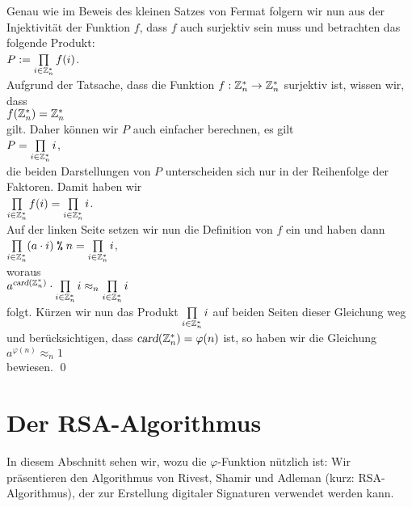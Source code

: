 Genau wie im Beweis des kleinen Satzes von Fermat folgern wir nun aus der Injektivität der Funktion $f$, dass
$f$ auch surjektiv sein muss und betrachten das folgende Produkt:
\\[0.2cm]
\hspace*{1.3cm}
$P := \prod\limits_{i \in \mathbb{Z}_{n}^*} f(i)$.
\\[0.2cm]
Aufgrund der Tatsache, dass die Funktion $f:\mathbb{Z}_{n}^* \rightarrow \mathbb{Z}_{n}^*$ surjektiv ist, wissen  wir, dass
\\[0.2cm]
\hspace*{1.3cm}
$f(\mathbb{Z}_{n}^*) = \mathbb{Z}_{n}^*$
\\[0.2cm]
gilt. Daher können wir $P$ auch einfacher berechnen, es gilt
\\[0.2cm]
\hspace*{1.3cm}
$P = \prod\limits_{i \in \mathbb{Z}_{n}^*} i$,
\\[0.2cm] 
die beiden Darstellungen von $P$ unterscheiden sich nur in der Reihenfolge der Faktoren.
Damit haben wir
\\[0.2cm]
\hspace*{1.3cm}
$\prod\limits_{i \in \mathbb{Z}_{n}^*} f(i) = \prod\limits_{i \in \mathbb{Z}_{n}^*} i$.
\\[0.2cm]
Auf der linken Seite setzen wir nun die Definition von $f$ ein und haben dann
\\[0.2cm]
\hspace*{1.3cm}
$\prod\limits_{i \in \mathbb{Z}_{n}^*} (a \cdot i) \;\texttt{\%}\; n = \prod\limits_{i \in \mathbb{Z}_{n}^*} i$,
\\[0.2cm]
woraus
\\[0.2cm]
\hspace*{1.3cm}
$a^{\textsl{card}(\mathbb{Z}_{n}^*)} \cdot \prod\limits_{i \in \mathbb{Z}_{n}^*} i \approx_n \prod\limits_{i \in \mathbb{Z}_{n}^*} i$
\\[0.2cm]
folgt.  Kürzen wir nun das Produkt $\prod\limits_{i \in \mathbb{Z}_{n}^*} i$ auf beiden Seiten dieser Gleichung 
weg und berücksichtigen, dass $\textsl{card}(\mathbb{Z}_{n}^*) = \varphi(n)$ ist, so haben wir die Gleichung
\\[0.2cm]
\hspace*{1.3cm}
$a^{\varphi(n)} \approx_n 1$
\\[0.2cm]
bewiesen.  \qed

\section{Der RSA-Algorithmus}
In diesem Abschnitt sehen wir, wozu die $\varphi$-Funktion nützlich ist:  Wir präsentieren den
Algorithmus von Rivest, Shamir und Adleman \cite{rivest:78} (kurz: RSA-Algorithmus), der zur Erstellung
digitaler Signaturen verwendet werden kann.


